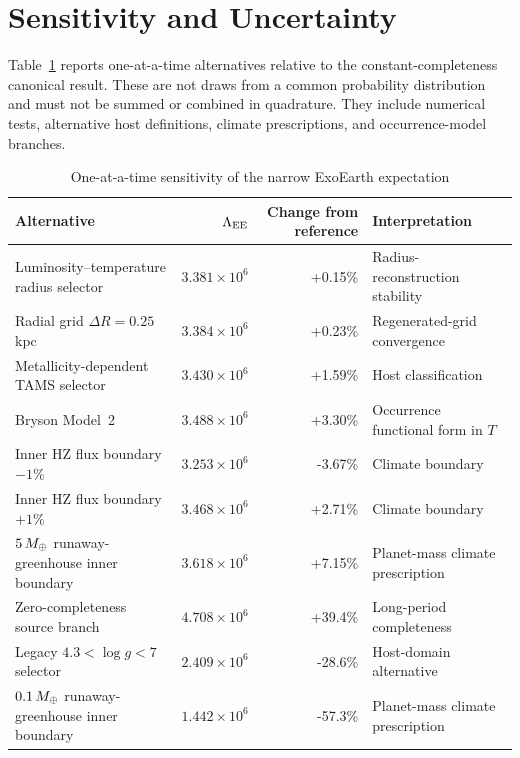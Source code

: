 \section{Sensitivity and Uncertainty}\label{sec:sensitivity}

Table~\ref{tab:sensitivity} reports one-at-a-time alternatives relative to the constant-completeness canonical result. These are not draws from a common probability distribution and must not be summed or combined in quadrature. They include numerical tests, alternative host definitions, climate prescriptions, and occurrence-model branches.

\begin{table}[t]
\caption{One-at-a-time sensitivity of the narrow ExoEarth expectation}
\label{tab:sensitivity}
\centering
\begin{tabular}{lrrl}
\toprule
Alternative & $\Lambda_{\rm EE}$ & Change from reference & Interpretation\\
\midrule
Luminosity--temperature radius selector & $3.381\times10^6$ & +0.15\% & Radius-reconstruction stability\\
Radial grid $\Delta R=0.25$ kpc & $3.384\times10^6$ & +0.23\% & Regenerated-grid convergence\\
Metallicity-dependent TAMS selector & $3.430\times10^6$ & +1.59\% & Host classification\\
Bryson Model~2 & $3.488\times10^6$ & +3.30\% & Occurrence functional form in $T$\\
Inner HZ flux boundary $-1\%$ & $3.253\times10^6$ & -3.67\% & Climate boundary\\
Inner HZ flux boundary $+1\%$ & $3.468\times10^6$ & +2.71\% & Climate boundary\\
$5\,M_{\oplus}$ runaway-greenhouse inner boundary & $3.618\times10^6$ & +7.15\% & Planet-mass climate prescription\\
Zero-completeness source branch & $4.708\times10^6$ & +39.4\% & Long-period completeness\\
Legacy $4.3<\log g<7$ selector & $2.409\times10^6$ & -28.6\% & Host-domain alternative\\
$0.1\,M_{\oplus}$ runaway-greenhouse inner boundary & $1.442\times10^6$ & -57.3\% & Planet-mass climate prescription\\
\bottomrule
\end{tabular}
\end{table}

